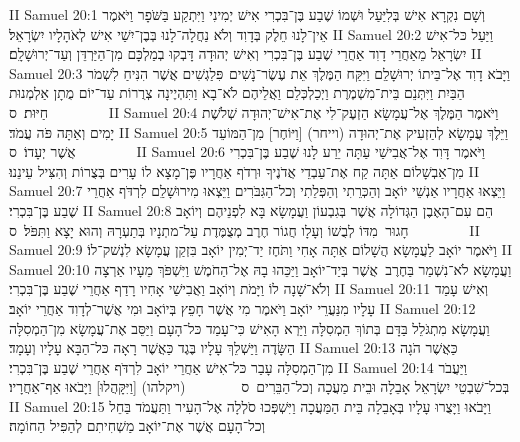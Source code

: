 II Samuel 20:1	וְשָׁם נִקְרָא אִישׁ בְּלִיַּעַל וּשְׁמוֹ שֶׁבַע בֶּן־בִּכְרִי אִישׁ יְמִינִי וַיִּתְקַע בַּשֹּׁפָר וַיֹּאמֶר אֵין־לָנוּ חֵלֶק בְּדָוִד וְלֹא נַחֲלָה־לָנוּ בְּבֶן־יִשַׁי אִישׁ לְאֹהָלָיו יִשְׂרָאֵל׃
II Samuel 20:2	וַיַּעַל כּל־אִישׁ יִשְׂרָאֵל מֵאַחֲרֵי דָוִד אַחֲרֵי שֶׁבַע בֶּן־בִּכְרִי וְאִישׁ יְהוּדָה דָּבְקוּ בְמַלְכָּם מִן־הַיַּרְדֵּן וְעַד־יְרוּשָׁלָ͏ִם׃
II Samuel 20:3	וַיָּבֹא דָוִד אֶל־בֵּיתוֹ יְרוּשָׁלַ͏ִם וַיִּקַּח הַמֶּלֶךְ אֵת עֶשֶׂר־נָשִׁים  פִּלַגְשִׁים אֲשֶׁר הִנִּיחַ לִשְׁמֹר הַבַּיִת וַיִּתְּנֵם בֵּית־מִשְׁמֶרֶת וַיְכַלְכְּלֵם וַאֲלֵיהֶם לֹא־בָא וַתִּהְיֶינָה צְרֻרוֹת עַד־יוֹם מֻתָן אַלְמְנוּת חַיּוּת׃ {ס}        
II Samuel 20:4	וַיֹּאמֶר הַמֶּלֶךְ אֶל־עֲמָשָׂא הַזְעֶק־לִי אֶת־אִישׁ־יְהוּדָה שְׁלֹשֶׁת יָמִים וְאַתָּה פֹּה עֲמֹד׃
II Samuel 20:5	וַיֵּלֶךְ עֲמָשָׂא לְהַזְעִיק אֶת־יְהוּדָה (וייחר) [וַיּוֹחֶר] מִן־הַמּוֹעֵד אֲשֶׁר יְעָדוֹ׃ {ס}        
II Samuel 20:6	וַיֹּאמֶר דָּוִד אֶל־אֲבִישַׁי עַתָּה יֵרַע לָנוּ שֶׁבַע בֶּן־בִּכְרִי מִן־אַבְשָׁלוֹם אַתָּה קַח אֶת־עַבְדֵי אֲדֹנֶיךָ וּרְדֹף אַחֲרָיו פֶּן־מָצָא לוֹ עָרִים בְּצֻרוֹת וְהִצִּיל עֵינֵנוּ׃
II Samuel 20:7	וַיֵּצְאוּ אַחֲרָיו אַנְשֵׁי יוֹאָב וְהַכְּרֵתִי וְהַפְּלֵתִי וְכל־הַגִּבֹּרִים וַיֵּצְאוּ מִירוּשָׁלַ͏ִם לִרְדֹּף אַחֲרֵי שֶׁבַע בֶּן־בִּכְרִי׃
II Samuel 20:8	הֵם עִם־הָאֶבֶן הַגְּדוֹלָה אֲשֶׁר בְּגִבְעוֹן וַעֲמָשָׂא בָּא לִפְנֵיהֶם וְיוֹאָב חָגוּר  מִדּוֹ לְבֻשׁוֹ וְעָלָו חֲגוֹר חֶרֶב מְצֻמֶּדֶת עַל־מתְנָיו בְּתַעְרָהּ וְהוּא יָצָא וַתִּפֹּל׃ {ס}        
II Samuel 20:9	וַיֹּאמֶר יוֹאָב לַעֲמָשָׂא הֲשָׁלוֹם אַתָּה אָחִי וַתֹּחֶז יַד־יְמִין יוֹאָב בִּזְקַן עֲמָשָׂא לִנְשׁק־לוֹ׃
II Samuel 20:10	וַעֲמָשָׂא לֹא־נִשְׁמַר בַּחֶרֶב  אֲשֶׁר בְּיַד־יוֹאָב וַיַּכֵּהוּ בָהּ אֶל־הַחֹמֶשׁ וַיִּשְׁפֹּךְ מֵעָיו אַרְצָה וְלֹא־שָׁנָה לוֹ וַיָּמֹת וְיוֹאָב וַאֲבִישַׁי אָחִיו רָדַף אַחֲרֵי שֶׁבַע בֶּן־בִּכְרִי׃
II Samuel 20:11	וְאִישׁ עָמַד עָלָיו מִנַּעֲרֵי יוֹאָב וַיֹּאמֶר מִי אֲשֶׁר חָפֵץ בְּיוֹאָב וּמִי אֲשֶׁר־לְדָוִד אַחֲרֵי יוֹאָב׃
II Samuel 20:12	וַעֲמָשָׂא מִתְגֹּלֵל בַּדָּם בְּתוֹךְ הַמְסִלָּה וַיַּרְא הָאִישׁ כִּי־עָמַד כּל־הָעָם וַיַּסֵּב אֶת־עֲמָשָׂא מִן־הַמְסִלָּה הַשָּׂדֶה וַיַּשְׁלֵךְ עָלָיו בֶּגֶד כַּאֲשֶׁר רָאָה כּל־הַבָּא עָלָיו וְעָמָד׃
II Samuel 20:13	כַּאֲשֶׁר הֹגָה מִן־הַמְסִלָּה עָבַר כּל־אִישׁ אַחֲרֵי יוֹאָב לִרְדֹּף אַחֲרֵי שֶׁבַע בֶּן־בִּכְרִי׃
II Samuel 20:14	וַיַּעֲבֹר בְּכל־שִׁבְטֵי יִשְׂרָאֵל אָבֵלָה וּבֵית מַעֲכָה וְכל־הַבֵּרִים {ס}        (ויקלהו) [וַיִּקָּהֲלוּ] וַיָּבֹאוּ אַף־אַחֲרָיו׃
II Samuel 20:15	וַיָּבֹאוּ וַיָּצֻרוּ עָלָיו בְּאָבֵלָה בֵּית הַמַּעֲכָה וַיִּשְׁפְּכוּ סֹלְלָה אֶל־הָעִיר וַתַּעֲמֹד בַּחֵל וְכל־הָעָם אֲשֶׁר אֶת־יוֹאָב מַשְׁחִיתִם לְהַפִּיל הַחוֹמָה׃
